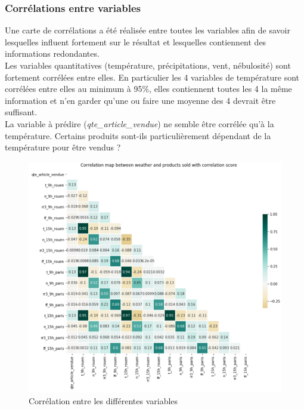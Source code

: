 \documentclass{article} %
\begin{document}
\subsubsection{Corrélations entre variables}
Une carte de corrélations a été réalisée entre toutes les variables afin de savoir lesquelles influent fortement sur le résultat et lesquelles contiennent des informations redondantes.\\
Les variables quantitatives (température, précipitations, vent, nébulosité) sont fortement corrélées entre elles. En particulier les 4 variables de température sont corrélées entre elles au minimum à 95\%, elles contiennent toutes les 4 la même information et n’en garder qu’une ou faire une moyenne des 4 devrait être suffisant. \\
La variable à prédire (\textit{qte\_article\_vendue}) ne semble être corrélée qu’à la température. Certains produits sont-ils particulièrement dépendant de la température pour être vendus ?
\begin{figure}[!h]
	\centering
	\includegraphics[keepaspectratio = true,scale=0.8]{corr.png}
	\caption{Corrélation entre les différentes variables}
	\label{fig:corr}
\end{figure}
\end{document}
